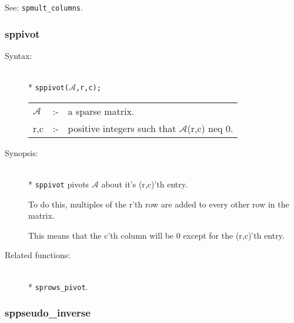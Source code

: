 See: \texttt{spmult\_columns}.


\subsubsection{sppivot}
\label{sparse:sppivot}
\hypertarget{operator:SPPIVOT}{}

\begin{description}
\item[Syntax:]\mbox{}\\*
\texttt{sppivot($\mathcal{A}$,r,c);}\\[2mm]
\begin{tabular}{l l l}
$\mathcal{A}$ &:-& a sparse matrix. \\
r,c        &:-& positive integers such that $\mathcal{A}$(r,c) neq 0.
\end{tabular}

\item[Synopsis:]\mbox{}\\*
\texttt{sppivot} pivots $\mathcal{A}$ about it's (r,c)'th entry.

To do this, multiples of the r'th row are added to every
     other row in the matrix.

This means that the c'th column
                will be 0 except for the (r,c)'th entry.

\item[Related functions:]\mbox{}\\*
\texttt{sprows\_pivot}.
\end{description}


\subsubsection{sppseudo\_inverse}
\label{sparse:sppseudo_inverse}
\hypertarget{operator:SPPSEUDO_INVERSE}{}

